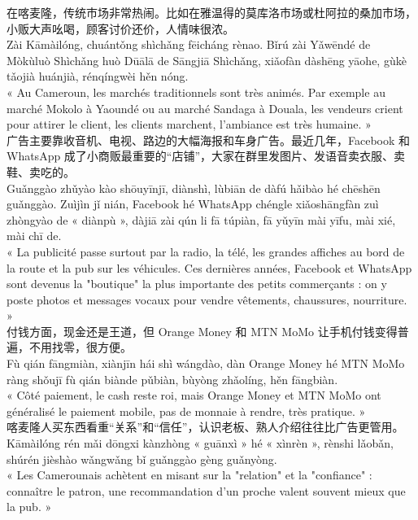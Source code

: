 \documentclass[11pt]{article}
\begin{document}
\begin{textebox}
在喀麦隆，传统市场非常热闹。比如在雅温得的莫库洛市场或杜阿拉的桑加市场，小贩大声吆喝，顾客讨价还价，人情味很浓。\\
Zài Kāmàilóng, chuántǒng shìchǎng fēicháng rènao. Bǐrú zài Yǎwēndé de Mòkùluò Shìchǎng huò Dūālā de Sāngjiā Shìchǎng, xiǎofàn dàshēng yāohe, gùkè tǎojià huánjià, rénqíngwèi hěn nóng.\\
« Au Cameroun, les marchés traditionnels sont très animés. Par exemple au marché Mokolo à Yaoundé ou au marché Sandaga à Douala, les vendeurs crient pour attirer le client, les clients marchent, l'ambiance est très humaine. »\\[0.4em]
广告主要靠收音机、电视、路边的大幅海报和车身广告。最近几年，Facebook 和 WhatsApp 成了小商贩最重要的“店铺”，大家在群里发图片、发语音卖衣服、卖鞋、卖吃的。\\
Guǎnggào zhǔyào kào shōuyīnjī, diànshì, lùbiān de dàfú hǎibào hé chēshēn guǎnggào. Zuìjìn jǐ nián, Facebook hé WhatsApp chéngle xiǎoshāngfàn zuì zhòngyào de « diànpù », dàjiā zài qún li fā túpiàn, fā yǔyīn mài yīfu, mài xié, mài chī de.\\
« La publicité passe surtout par la radio, la télé, les grandes affiches au bord de la route et la pub sur les véhicules. Ces dernières années, Facebook et WhatsApp sont devenus la "boutique" la plus importante des petits commerçants : on y poste photos et messages vocaux pour vendre vêtements, chaussures, nourriture. »\\[0.4em]
付钱方面，现金还是王道，但 Orange Money 和 MTN MoMo 让手机付钱变得普遍，不用找零，很方便。\\
Fù qián fāngmiàn, xiànjīn hái shì wángdào, dàn Orange Money hé MTN MoMo ràng shǒujī fù qián biànde pǔbiàn, bùyòng zhǎolíng, hěn fāngbiàn.\\
« Côté paiement, le cash reste roi, mais Orange Money et MTN MoMo ont généralisé le paiement mobile, pas de monnaie à rendre, très pratique. »\\[0.4em]
喀麦隆人买东西看重“关系”和“信任”，认识老板、熟人介绍往往比广告更管用。\\
Kāmàilóng rén mǎi dōngxi kànzhòng « guānxì » hé « xìnrèn », rènshi lǎobǎn, shúrén jièshào wǎngwǎng bǐ guǎnggào gèng guǎnyòng.\\
« Les Camerounais achètent en misant sur la "relation" et la "confiance" : connaître le patron, une recommandation d'un proche valent souvent mieux que la pub. »
\end{textebox}
\end{document}
